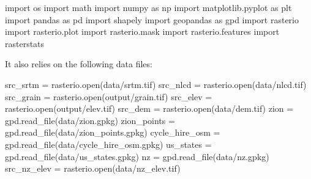 \documentclass[
  letterpaper,
]{krantz}
\newenvironment{Shaded}{\begin{snugshade}}{\end{snugshade}}
\newcommand{\BuiltInTok}[1]{\textcolor[rgb]{0.00,0.23,0.31}{#1}}
\newcommand{\ImportTok}[1]{\textcolor[rgb]{0.00,0.46,0.62}{#1}}
\newcommand{\NormalTok}[1]{\textcolor[rgb]{0.00,0.23,0.31}{#1}}
\newcommand{\OperatorTok}[1]{\textcolor[rgb]{0.37,0.37,0.37}{#1}}
\newcommand{\StringTok}[1]{\textcolor[rgb]{0.13,0.47,0.30}{#1}}
\begin{document}
\begin{Shaded}
\begin{Highlighting}[]
\ImportTok{import}\NormalTok{ os}
\ImportTok{import}\NormalTok{ math}
\ImportTok{import}\NormalTok{ numpy }\ImportTok{as}\NormalTok{ np}
\ImportTok{import}\NormalTok{ matplotlib.pyplot }\ImportTok{as}\NormalTok{ plt}
\ImportTok{import}\NormalTok{ pandas }\ImportTok{as}\NormalTok{ pd}
\ImportTok{import}\NormalTok{ shapely}
\ImportTok{import}\NormalTok{ geopandas }\ImportTok{as}\NormalTok{ gpd}
\ImportTok{import}\NormalTok{ rasterio}
\ImportTok{import}\NormalTok{ rasterio.plot}
\ImportTok{import}\NormalTok{ rasterio.mask}
\ImportTok{import}\NormalTok{ rasterio.features}
\ImportTok{import}\NormalTok{ rasterstats}
\end{Highlighting}
\end{Shaded}

It also relies on the following data files:

\begin{Shaded}
\begin{Highlighting}[]
\NormalTok{src\_srtm }\OperatorTok{=}\NormalTok{ rasterio.}\BuiltInTok{open}\NormalTok{(}\StringTok{\textquotesingle{}data/srtm.tif\textquotesingle{}}\NormalTok{)}
\NormalTok{src\_nlcd }\OperatorTok{=}\NormalTok{ rasterio.}\BuiltInTok{open}\NormalTok{(}\StringTok{\textquotesingle{}data/nlcd.tif\textquotesingle{}}\NormalTok{)}
\NormalTok{src\_grain }\OperatorTok{=}\NormalTok{ rasterio.}\BuiltInTok{open}\NormalTok{(}\StringTok{\textquotesingle{}output/grain.tif\textquotesingle{}}\NormalTok{)}
\NormalTok{src\_elev }\OperatorTok{=}\NormalTok{ rasterio.}\BuiltInTok{open}\NormalTok{(}\StringTok{\textquotesingle{}output/elev.tif\textquotesingle{}}\NormalTok{)}
\NormalTok{src\_dem }\OperatorTok{=}\NormalTok{ rasterio.}\BuiltInTok{open}\NormalTok{(}\StringTok{\textquotesingle{}data/dem.tif\textquotesingle{}}\NormalTok{)}
\NormalTok{zion }\OperatorTok{=}\NormalTok{ gpd.read\_file(}\StringTok{\textquotesingle{}data/zion.gpkg\textquotesingle{}}\NormalTok{)}
\NormalTok{zion\_points }\OperatorTok{=}\NormalTok{ gpd.read\_file(}\StringTok{\textquotesingle{}data/zion\_points.gpkg\textquotesingle{}}\NormalTok{)}
\NormalTok{cycle\_hire\_osm }\OperatorTok{=}\NormalTok{ gpd.read\_file(}\StringTok{\textquotesingle{}data/cycle\_hire\_osm.gpkg\textquotesingle{}}\NormalTok{)}
\NormalTok{us\_states }\OperatorTok{=}\NormalTok{ gpd.read\_file(}\StringTok{\textquotesingle{}data/us\_states.gpkg\textquotesingle{}}\NormalTok{)}
\NormalTok{nz }\OperatorTok{=}\NormalTok{ gpd.read\_file(}\StringTok{\textquotesingle{}data/nz.gpkg\textquotesingle{}}\NormalTok{)}
\NormalTok{src\_nz\_elev }\OperatorTok{=}\NormalTok{ rasterio.}\BuiltInTok{open}\NormalTok{(}\StringTok{\textquotesingle{}data/nz\_elev.tif\textquotesingle{}}\NormalTok{)}
\end{Highlighting}
\end{Shaded}
\end{document}

